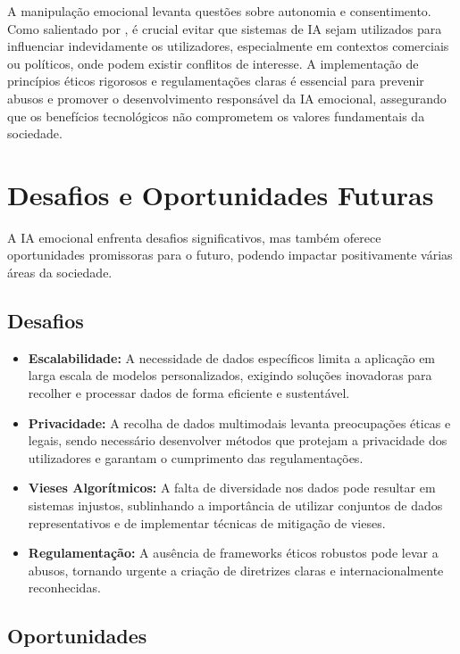 \documentclass[a4paper,12pt]{report}
\begin{document}
	A manipulação emocional levanta questões sobre autonomia e consentimento. Como salientado por \textcite{haidt2001}, é crucial evitar que sistemas de IA sejam utilizados para influenciar indevidamente os utilizadores, especialmente em contextos comerciais ou políticos, onde podem existir conflitos de interesse. A implementação de princípios éticos rigorosos e regulamentações claras é essencial para prevenir abusos e promover o desenvolvimento responsável da IA emocional, assegurando que os benefícios tecnológicos não comprometem os valores fundamentais da sociedade.
	
	\section{Desafios e Oportunidades Futuras}
	
	A IA emocional enfrenta desafios significativos, mas também oferece oportunidades promissoras para o futuro, podendo impactar positivamente várias áreas da sociedade.
	
	\subsection{Desafios}
	
	\begin{itemize} \item \textbf{Escalabilidade:} A necessidade de dados específicos limita a aplicação em larga escala de modelos personalizados, exigindo soluções inovadoras para recolher e processar dados de forma eficiente e sustentável. \item \textbf{Privacidade:} A recolha de dados multimodais levanta preocupações éticas e legais, sendo necessário desenvolver métodos que protejam a privacidade dos utilizadores e garantam o cumprimento das regulamentações. \item \textbf{Vieses Algorítmicos:} A falta de diversidade nos dados pode resultar em sistemas injustos, sublinhando a importância de utilizar conjuntos de dados representativos e de implementar técnicas de mitigação de vieses. \item \textbf{Regulamentação:} A ausência de frameworks éticos robustos pode levar a abusos, tornando urgente a criação de diretrizes claras e internacionalmente reconhecidas. \end{itemize}
	
	\subsection{Oportunidades}
	
\end{document}
